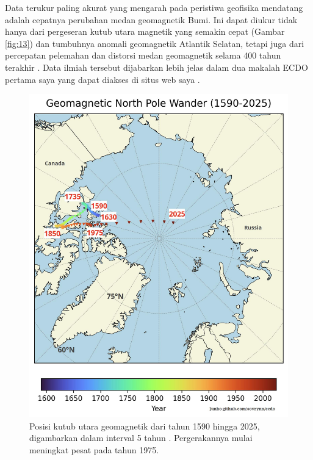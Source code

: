 \documentclass[10pt,twocolumn,letterpaper]{article}
\begin{document}
Data terukur paling akurat yang mengarah pada peristiwa geofisika mendatang adalah cepatnya perubahan medan geomagnetik Bumi. Ini dapat diukur tidak hanya dari pergeseran kutub utara magnetik yang semakin cepat (Gambar \ref{fig:13}) dan tumbuhnya anomali geomagnetik Atlantik Selatan, tetapi juga dari percepatan pelemahan dan distorsi medan geomagnetik selama 400 tahun terakhir \cite{3}. Data ilmiah tersebut dijabarkan lebih jelas dalam dua makalah ECDO pertama saya yang dapat diakses di situs web saya \cite{3}.

\begin{figure}[t]
\begin{center}
   \includegraphics[width=1\linewidth]{npw.jpg}
\end{center}
   \caption{Posisi kutub utara geomagnetik dari tahun 1590 hingga 2025, digambarkan dalam interval 5 tahun \cite{41}. Pergerakannya mulai meningkat pesat pada tahun 1975.}
\label{fig:13}
\label{fig:onecol}
\end{figure}
\end{document}
